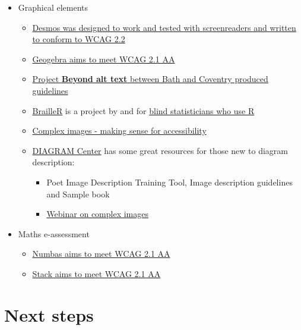 \documentclass[
  12pt,
  a4-paperpaper,
  DIV=11,
  numbers=noendperiod]{scrartcl}
\providecommand{\tightlist}{%
  \setlength{\itemsep}{0pt}\setlength{\parskip}{0pt}}
\begin{document}
\begin{itemize}
\tightlist
\item
  Graphical elements

  \begin{itemize}
  \tightlist
  \item
    \href{https://www.desmos.com/accessibility}{Desmos was designed to
    work and tested with screenreaders and written to conform to WCAG
    2.2}
  \item
    \href{https://www.geogebra.org/m/r2EF8uRx}{Geogebra aims to meet
    WCAG 2.1 AA}
  \item
    \href{https://bathmash.github.io/CETL-MSOR-2022-Beyond-alt-text/index.html}{Project
    \textbf{Beyond alt text} between Bath and Coventry produced
    guidelines}
  \item
    \href{https://github.com/ajrgodfrey/BrailleR}{BrailleR} is a project
    by and for \href{https://r-resources.massey.ac.nz/BrailleR/}{blind
    statisticians who use R}
  \item
    \href{https://www.learningapps.co.uk/moodle/xertetoolkits/play.php?template_id=3023\#page1}{Complex
    images - making sense for accessibility}
  \item
    \href{http://diagramcenter.org/}{DIAGRAM Center} has some great
    resources for those new to diagram description:

    \begin{itemize}
    \tightlist
    \item
      Poet Image Description Training Tool, Image description guidelines
      and Sample book
    \item
      \href{http://diagramcenter.org/diagramwebinars.html\#compleximages}{Webinar
      on complex images}
    \end{itemize}
  \end{itemize}
\item
  Maths e-assessment

  \begin{itemize}
  \tightlist
  \item
    \href{https://docs.numbas.org.uk/en/latest/accessibility/editor.html}{Numbas
    aims to meet WCAG 2.1 AA}
  \item
    \href{https://stack-assessment.org/Legal/Accessibility/}{Stack aims
    to meet WCAG 2.1 AA}
  \end{itemize}
\end{itemize}

\section{Next steps}\label{next-steps}
\end{document}

